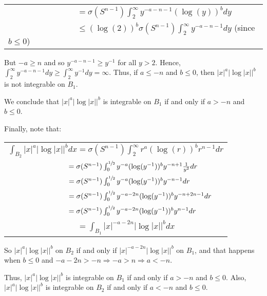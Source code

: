 \documentclass{book}
\newenvironment{myIndent}{%
   \begin{adjustwidth}{2.5em}{0em}%
}{%
   \end{adjustwidth}%
}
\newcommand{\retTwo}{\hfill\bigbreak}
\begin{document}
\begin{myIndent}
{\begin{tabular}{l}
		$\phantom{\int_{\mathbb{R}^n} |x|^a|\log|x||^b dx} = \sigma(S^{n-1})\int_{2}^{\infty}y^{-a-n-1}(\log(y))^bdy$\\ [4pt]

		$\phantom{\int_{\mathbb{R}^n} |x|^a|\log|x||^b dx} \leq (\log(2))^b\sigma(S^{n-1})\int_{2}^{\infty}y^{-a-n-1}dy$ (since $b \leq 0$)
	\end{tabular}\retTwo\par}

	But $-a \geq n$ and so $y^{-a-n-1} \geq y^{-1}$ for all $y > 2$. Hence, $\int_{2}^{\infty}y^{-a-n-1}dy \geq \int_{2}^{\infty}y^{-1}dy = \infty$.  Thus, if $a \leq -n$ and $b \leq 0$, then $|x|^a|\log|x||^b$ is not integrable on $B_1$.\retTwo

	We conclude that $|x|^a|\log|x||^b$ is integrable on $B_1$ if and only if $a > -n$ and $b \leq 0$.\retTwo

	Finally, note that:

	{\centering 
	\begin{tabular}{l}
		$\int_{B_2}|x|^a|\log|x||^bdx = \sigma(S^{n-1})\int_2^\infty r^a (\log(r))^b r^{n-1}dr$\\ [4pt]

		$\phantom{\int_{B_2}|x|^a|\log|x||^bdx} = \sigma(S^{n-1})\int_0^{\sfrac{1}{2}} y^{-a} (\log(y^{-1}))^b y^{-n+1}\frac{1}{y^2}dr$\\ [4pt]

		$\phantom{\int_{B_2}|x|^a|\log|x||^bdx} = \sigma(S^{n-1})\int_0^{\sfrac{1}{2}} y^{-a} (\log(y^{-1}))^b y^{-n-1}dr$\\ [4pt]

		$\phantom{\int_{B_2}|x|^a|\log|x||^bdx} = \sigma(S^{n-1})\int_0^{\sfrac{1}{2}} y^{-a - 2n} (\log(y^{-1}))^b y^{-n+2n-1}dr$\\ [4pt]

		$\phantom{\int_{B_2}|x|^a|\log|x||^bdx} = \sigma(S^{n-1})\int_0^{\sfrac{1}{2}} y^{-a - 2n} (\log(y^{-1}))^b y^{n-1}dr$\\ [4pt]

		$\phantom{\int_{B_2}|x|^a|\log|x||^bdx} = \int_{B_1} |x|^{-a-2n}|\log|x||^bdx$\\ [4pt]
	\end{tabular}\retTwo\par}

	So $|x|^a|\log|x||^b$ on $B_2$ if and only if $|x|^{-a-2n}|\log|x||^b$ on $B_1$, and that happens when $b \leq 0$ and $-a-2n > -n \Longrightarrow -a > n \Longrightarrow a < -n$.\retTwo

	Thus, $|x|^a|\log|x||^b$ is integrable on $B_1$ if and only if $a > -n$ and $b \leq 0$. Also, $|x|^a|\log|x||^b$ is integrable on $B_2$ if and only if $a < -n$ and $b \leq 0$.
\end{myIndent}
\end{document}
